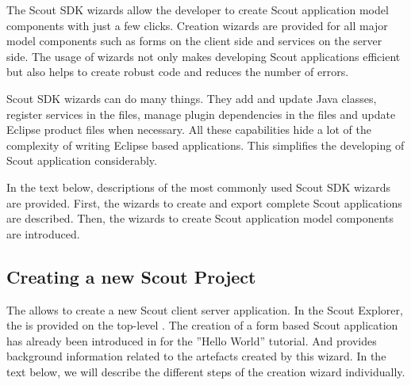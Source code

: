 \documentclass[a4paper,10pt,twoside]{book}
\begin{document}
The Scout SDK wizards allow the developer to create Scout application model components with just a few clicks. 
Creation wizards are provided for all major model components such as forms on the client side and services on the server side. 
The usage of wizards not only makes developing Scout applications efficient but also helps to create robust code and reduces the number of errors. 

Scout SDK wizards can do many things. 
They add and update Java classes, register services in the  files, manage plugin dependencies in the  files and update Eclipse product files when necessary. 
All these capabilities hide a lot of the complexity of writing Eclipse based applications. 
This simplifies the developing of Scout application considerably.

In the text below, descriptions of the most commonly used Scout SDK wizards are provided. 
First, the wizards to create and export complete Scout applications are described. 
Then, the wizards to create Scout application model components are introduced. 

\subsection{Creating a new Scout Project}

The  allows to create a new Scout client server application. 
In the Scout Explorer, the  is provided on the top-level . 
The creation of a form based Scout application has already been introduced in  for the ''Hello World'' tutorial.
And  provides background information related to the artefacts created by this wizard. 
In the text below, we will describe the different steps of the creation wizard individually.
\end{document}
